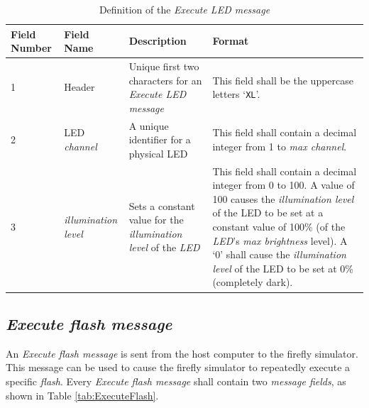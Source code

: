 \documentclass[letterpaper,11pt]{article}
\begin{document}
\begin{table}[H]
  \caption{Definition of the \textit{Execute LED message}}
  \centering
  \setlength\extrarowheight{2pt}
  \begin{tabular}[h]{|p{0.5in}|p{1.00in}|p{2.25in}|p{2.25in}|} \hline
    Field Number & Field Name & Description & Format \\ \hline
    1            & Header
                 & Unique first two characters for an \textit{Execute LED
                 message}
                 & This field shall be the uppercase letters `\texttt{XL}'.
                 \\ \hline
    2            & LED \textit{channel}
                 & A unique identifier for a physical LED
                 & This field shall contain a decimal integer from 1 to
                 \textit{max channel}.
                 \\ \hline
    3            & \textit{illumination level}
                 & Sets a constant value for the \textit{illumination level}
                 of the \textit{LED}
                 & This field shall contain a decimal integer from 0 to 100.
                 A value of 100 causes the \textit{illumination level} of the
                 LED to be set at a constant value of 100\% (of the
                 \textit{LED}'s \textit{max brightness} level). A `0' shall
                 cause the \textit{illumination level} of the LED to be set at
                 0\% (completely dark).
                 \\ \hline
  \end{tabular}
  \label{tab:ExecuteLED}
\end{table}

\subsection{\textit{Execute flash message}}

An \textit{Execute flash message} is sent from the host computer to the
firefly simulator. This message can be used to cause the firefly simulator to
repeatedly execute a specific \textit{flash}. Every \textit{Execute
flash message} shall contain two \textit{message fields}, as shown in Table
\ref{tab:ExecuteFlash}.
\end{document}
